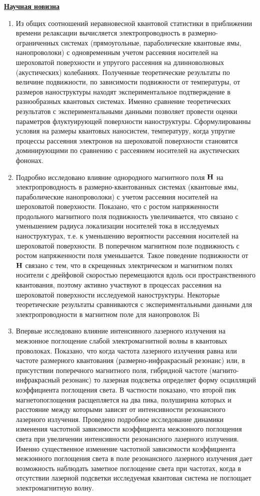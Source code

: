 \underline{\textbf{Научная новизна}}
\begin{enumerate}
	\item Из общих соотношений неравновесной квантовой статистики в приближении времени релаксации вычисляется электропроводность в размерно-ограниченных системах (прямоугольные, параболические квантовые ямы, нанопроволоки) с одновременным учетом рассеяния носителей на шероховатой поверхности и упругого рассеяния на длинноволновых (акустических) колебаниях. Полученные теоретические результаты по величине подвижности, по зависимости подвижности от температуры,  от размеров наноструктуры находят экспериментальное подтверждение в разнообразных квантовых системах. Именно сравнение теоретических результатов с экспериментальными данными позволяет провести оценки параметров флуктуирующей поверхности наноструктуры. Сформулированны условия на размеры квантовых наносистем, температуру, когда упругие процессы рассеяния электронов на шероховатой поверхности становятся доминирующими по сравнению с рассеянием носителей на акустических фононах.
	\item Подробно исследовано влияние однородного магнитного поля $\boldsymbol{\mathbf{H}}$ на электропроводность в размерно-квантованных системах (квантовые ямы, параболические нанопроволоки) с учетом рассеяния носителей на шероховатой поверхности. Показано, что с ростом напряженности продольного магнитного поля подвижность увеличивается, что связано с уменьшением радиуса локализации носителей тока в исследуемых наноструктурах, т.е. к уменьшению вероятности рассеяния носителей на шероховатой поверхности. В поперечном магнитном поле подвижность с ростом напряженности поля уменьшается. Такое поведение подвижности от $\boldsymbol{\mathbf{H}}$ связано с тем, что в скрещенных электрическом и магнитном полях носители с дрейфовой скоростью перемещаются вдоль оси пространственного квантования, поэтому активно участвуют в процессах рассеяния на шероховатой поверхности исследуемой наноструктуры. Некоторые теоретические результаты сравниваются с экспериментальными данными для электропроводности в магнитном поле для нанопроволок Bi
	\item Впервые исследовано влияние интенсивного лазерного излучения на межзонное поглощение слабой электромагнитной волны в квантовых проволоках. Показано, что когда частота лазерного излучения равна или частоте размерного квантования (размерно-инфракрасный резонанс) или, в присутствии поперечного магнитного поля, гибридной частоте (магнито-инфракрасный резонанс) то лазерная подсветка определяет форму осцилляций коэффициента поглощения света. В частности показано, что второй пик магнетопоглощения расщепляется на два пика, полуширина которых и расстояние между которыми зависят от интенсивности резонансного лазерного излучения. Проведено подробное исследование динамики изменения частотной зависимости коэффициента межзонного поглощения света при увеличении интенсивности резонансного лазерного излучения. Именно существенное изменение частотной зависимости коэффициента межзонного поглощения света в поле резонансного лазерного излучения дает возможность наблюдать заметное поглощение света при частотах, когда в отсутствии лазерной подсветки исследуемая квантовая система не поглощает электромагнитную волну.

\end{enumerate}
